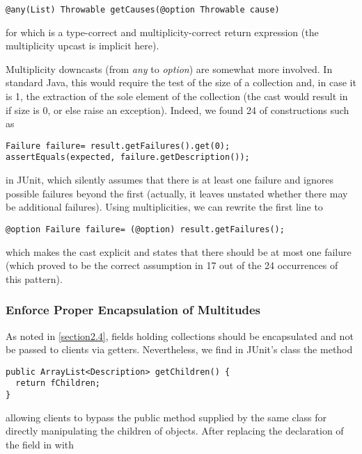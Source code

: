 {\begin{lstlisting}
@any(List) Throwable getCauses(@option Throwable cause)
\end{lstlisting}

\noindent for which  is a type-correct and multiplicity-correct
return expression (the multiplicity upcast is implicit here).

Multiplicity downcasts (from \emph{any} to \emph{option}) are
somewhat more involved. In standard Java, this would require the test of the
size of a collection and, in case it is 1, the extraction of the sole
element of the collection (the cast would result in  if size is
0, or else raise an exception). Indeed, we found 24 of constructions such as

\begin{lstlisting}
Failure failure= result.getFailures().get(0);
assertEquals(expected, failure.getDescription());
\end{lstlisting}

\noindent in JUnit, which silently assumes that there is at least one
failure and ignores possible failures beyond the first (actually, it leaves
unstated whether there may be additional failures). Using multiplicities, we
can rewrite the first line to

\begin{lstlisting}
@option Failure failure= (@option) result.getFailures();
\end{lstlisting}

\noindent which makes the cast explicit and states that there should be at
most one failure (which proved to be the correct assumption in 17 out of the
24 occurrences of this pattern).

\subsubsection{Enforce Proper Encapsulation of Multitudes}
\label{section6.1.4}

\noindent As noted in \autoref{section2.4}, fields holding collections should be
encapsulated and not be passed to clients via getters. Nevertheless, we find
in JUnit's class  the method

\begin{lstlisting}
public ArrayList<Description> getChildren() {
  return fChildren;
}
\end{lstlisting}

\noindent allowing clients to bypass the public method 
supplied by the same class for directly manipulating the children of
 objects. After replacing the declaration of the field
 in  with

}
